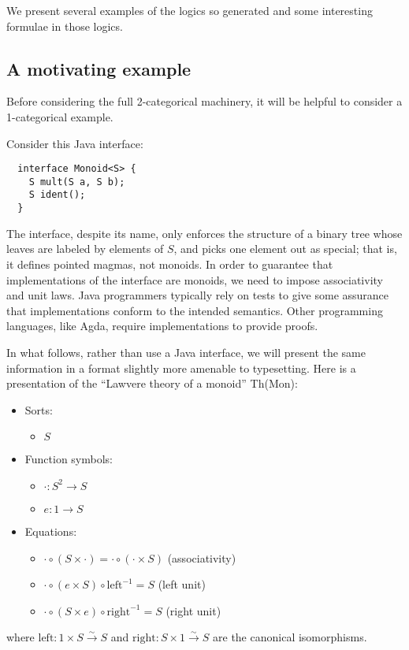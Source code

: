 \documentclass{article}
\newcommand{\maps}{\colon}
\renewcommand{\left}{\mathrm{left}}
\renewcommand{\right}{\mathrm{right}}
\begin{document}
We present several examples of the logics so generated and some interesting formulae in those logics.

\subsection{A motivating example}

Before considering the full 2-categorical machinery, it will be helpful to consider a 1-categorical example.

Consider this Java interface:
\begin{verbatim}
  interface Monoid<S> {
    S mult(S a, S b);
    S ident();
  }
\end{verbatim}
The interface, despite its name, only enforces the structure of a binary tree whose leaves are labeled by elements of $S$, and picks one element out as special; that is, it defines pointed magmas, not monoids.  In order to guarantee that implementations of the interface are monoids, we need to impose associativity and unit laws.  Java programmers typically rely on tests to give some assurance that implementations conform to the intended semantics.  Other programming languages, like Agda, require implementations to provide proofs.

In what follows, rather than use a Java interface, we will present the same information in a format slightly more amenable to typesetting.  Here is a presentation of the ``Lawvere theory of a monoid'' Th(Mon):\\
\begin{center}
  \begin{itemize}
    \item Sorts:
    \begin{itemize}
      \item $S$
    \end{itemize}
    \item Function symbols:
    \begin{itemize}
      \item $\cdot\maps S^2 \to S$
      \item $e\maps 1 \to S$
    \end{itemize}
    \item Equations:
    \begin{itemize}
      \item $\cdot \circ (S \times \cdot) = \cdot \circ (\cdot \times S)$ (associativity)
      \item $\cdot \circ (e \times S) \circ \left^{-1} = S$ (left unit)
      \item $\cdot \circ (S \times e) \circ \right^{-1} = S$ (right unit)        
    \end{itemize}
  \end{itemize}
\end{center}
where ${\left\maps 1 \times S \stackrel{\sim}{\to} S}$ and ${\right\maps S \times 1 \stackrel{\sim}{\to} S}$ are the canonical isomorphisms.
\end{document}
